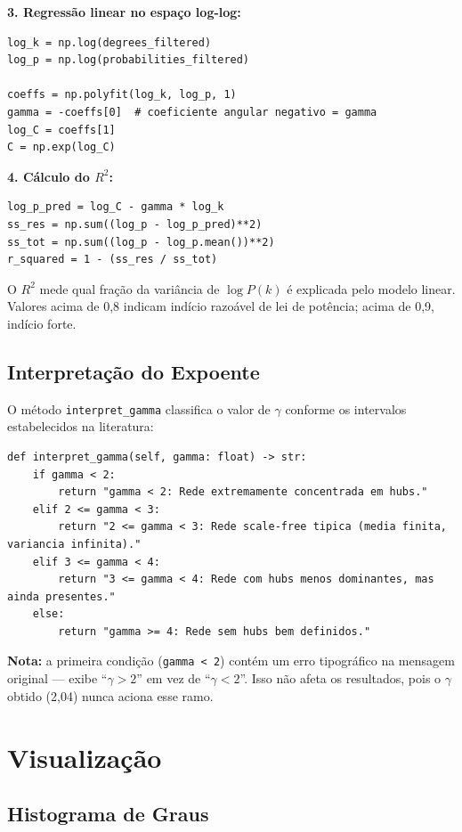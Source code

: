 \documentclass[12pt,a4paper]{article}
\begin{document}
\textbf{3. Regressão linear no espaço log-log:}
\begin{lstlisting}
log_k = np.log(degrees_filtered)
log_p = np.log(probabilities_filtered)

coeffs = np.polyfit(log_k, log_p, 1)
gamma = -coeffs[0]  # coeficiente angular negativo = gamma
log_C = coeffs[1]
C = np.exp(log_C)
\end{lstlisting}

\textbf{4. Cálculo do $R^2$:}
\begin{lstlisting}
log_p_pred = log_C - gamma * log_k
ss_res = np.sum((log_p - log_p_pred)**2)
ss_tot = np.sum((log_p - log_p.mean())**2)
r_squared = 1 - (ss_res / ss_tot)
\end{lstlisting}

O $R^2$ mede qual fração da variância de $\log P(k)$ é explicada pelo modelo linear. Valores acima de 0,8 indicam indício razoável de lei de potência; acima de 0,9, indício forte.

\subsection{Interpretação do Expoente}

O método \texttt{interpret\_gamma} classifica o valor de $\gamma$ conforme os intervalos estabelecidos na literatura:

\begin{lstlisting}
def interpret_gamma(self, gamma: float) -> str:
    if gamma < 2:
        return "gamma < 2: Rede extremamente concentrada em hubs."
    elif 2 <= gamma < 3:
        return "2 <= gamma < 3: Rede scale-free tipica (media finita, variancia infinita)."
    elif 3 <= gamma < 4:
        return "3 <= gamma < 4: Rede com hubs menos dominantes, mas ainda presentes."
    else:
        return "gamma >= 4: Rede sem hubs bem definidos."
\end{lstlisting}

\textbf{Nota:} a primeira condição (\texttt{gamma < 2}) contém um erro tipográfico na mensagem original — exibe ``$\gamma > 2$'' em vez de ``$\gamma < 2$''. Isso não afeta os resultados, pois o $\gamma$ obtido (2,04) nunca aciona esse ramo.

\section{Visualização}

\subsection{Histograma de Graus}
\end{document}

